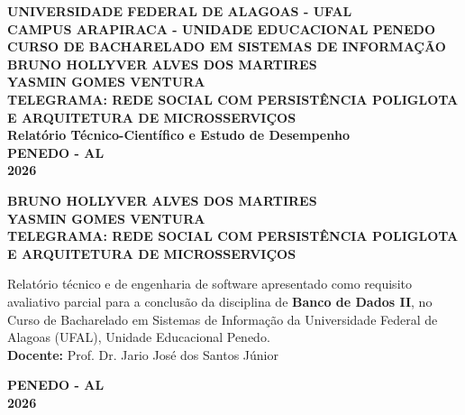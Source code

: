 \documentclass[12pt,a4paper]{report}
\begin{document}
\begin{titlepage}
    \centering
    \vspace*{0.5cm}
    {\large \textbf{UNIVERSIDADE FEDERAL DE ALAGOAS - UFAL}}\\[0.2cm]
    {\large \textbf{CAMPUS ARAPIRACA - UNIDADE EDUCACIONAL PENEDO}}\\[0.2cm]
    {\large \textbf{CURSO DE BACHARELADO EM SISTEMAS DE INFORMAÇÃO}}\\[3.5cm]
    
    {\Large \textbf{BRUNO HOLLYVER ALVES DOS MARTIRES}}\\[0.3cm]
    {\Large \textbf{YASMIN GOMES VENTURA}}\\[3.5cm]
    
    {\LARGE \textbf{TELEGRAMA: REDE SOCIAL COM PERSISTÊNCIA POLIGLOTA E ARQUITETURA DE MICROSSERVIÇOS}}\\[0.4cm]
    {\large \textbf{Relatório Técnico-Científico e Estudo de Desempenho}}\\[4cm]
    
    \vfill
    {\large \textbf{PENEDO - AL}}\\[0.2cm]
    {\large \textbf{2026}}
\end{titlepage}

\begin{titlepage}
    \centering
    \vspace*{0.5cm}
    {\large \textbf{BRUNO HOLLYVER ALVES DOS MARTIRES}}\\[0.3cm]
    {\large \textbf{YASMIN GOMES VENTURA}}\\[4cm]
    
    {\LARGE \textbf{TELEGRAMA: REDE SOCIAL COM PERSISTÊNCIA POLIGLOTA E ARQUITETURA DE MICROSSERVIÇOS}}\\[2.5cm]
    
    \hfill
    \begin{minipage}{0.55\textwidth}
        \small
        Relatório técnico e de engenharia de software apresentado como requisito avaliativo parcial para a conclusão da disciplina de \textbf{Banco de Dados II}, no Curso de Bacharelado em Sistemas de Informação da Universidade Federal de Alagoas (UFAL), Unidade Educacional Penedo.\\[0.4cm]
        \textbf{Docente:} Prof. Dr. Jario José dos Santos Júnior
    \end{minipage}
    
    \vfill
    {\large \textbf{PENEDO - AL}}\\[0.2cm]
    {\large \textbf{2026}}
\end{titlepage}
\end{document}
